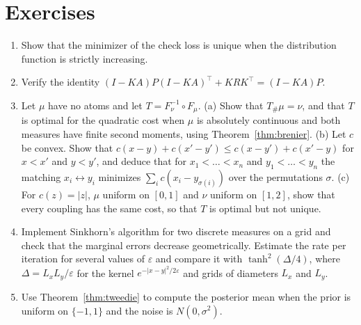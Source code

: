 \section*{Exercises}
\begin{enumerate}
\item Show that the minimizer of the check loss is unique when the distribution function is strictly increasing.
\item Verify the identity $(I-KA)P(I-KA)^\top+KRK^\top = (I-KA)P$.
\item Let $\mu$ have no atoms and let $T = F_\nu^{-1}\circ F_\mu$. (a) Show that $T_\#\mu = \nu$, and that $T$ is optimal for the quadratic cost when $\mu$ is absolutely continuous and both measures have finite second moments, using Theorem~\ref{thm:brenier}. (b) Let $c$ be convex. Show that $c(x-y)+c(x'-y')\leq c(x-y')+c(x'-y)$ for $x<x'$ and $y<y'$, and deduce that for $x_1<\dots<x_n$ and $y_1<\dots<y_n$ the matching $x_i\leftrightarrow y_i$ minimizes $\sum_ic(x_i-y_{\sigma(i)})$ over the permutations $\sigma$. (c) For $c(z) = |z|$, $\mu$ uniform on $[0,1]$ and $\nu$ uniform on $[1,2]$, show that every coupling has the same cost, so that $T$ is optimal but not unique.
\item Implement Sinkhorn's algorithm for two discrete measures on a grid and check that the marginal errors decrease geometrically. Estimate the rate per iteration for several values of $\varepsilon$ and compare it with $\tanh^2(\Delta/4)$, where $\Delta = L_xL_y/\varepsilon$ for the kernel $e^{-|x-y|^2/2\varepsilon}$ and grids of diameters $L_x$ and $L_y$.
\item Use Theorem~\ref{thm:tweedie} to compute the posterior mean when the prior is uniform on $\{-1,1\}$ and the noise is $N(0,\sigma^2)$.
\end{enumerate}

